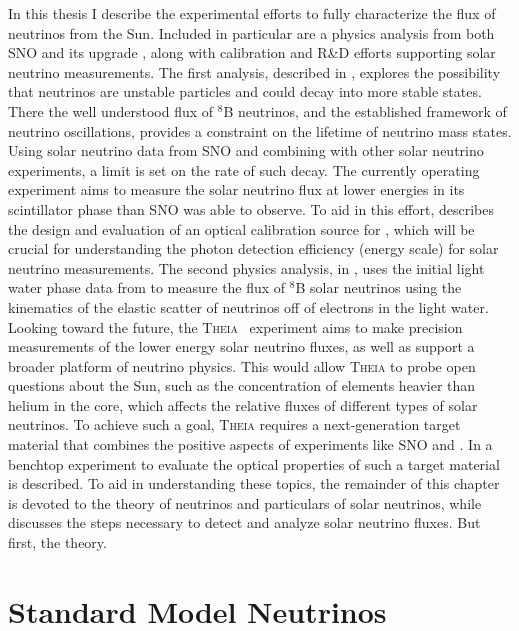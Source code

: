 In this thesis I describe the experimental efforts to fully characterize the flux of neutrinos from the Sun.
Included in particular are a physics analysis from both SNO and its upgrade {\snop}, along with calibration and R\&D efforts supporting solar neutrino measurements.
The first analysis, described in , explores the possibility that neutrinos are unstable particles and could decay into more stable states.
There the well understood flux of $^8$B neutrinos, and the established framework of neutrino oscillations, provides a constraint on the lifetime of neutrino mass states.
Using solar neutrino data from SNO and combining with other solar neutrino experiments, a limit is set on the rate of such decay.
The currently operating {\snop} experiment aims to measure the solar neutrino flux at lower energies in its scintillator phase than SNO was able to observe.
To aid in this effort,  describes the design and evaluation of an optical calibration source for {\snop}, which will be crucial for understanding the photon detection efficiency (energy scale) for solar neutrino measurements.
The second physics analysis, in , uses the initial light water phase data from {\snop} to measure the flux of $^8$B solar neutrinos using the kinematics of the elastic scatter of neutrinos off of electrons in the light water.
Looking toward the future, the \textsc{Theia}~\cite{asdc} experiment aims to make precision measurements of the lower energy solar neutrino fluxes, as well as support a broader platform of neutrino physics.
This would allow \textsc{Theia} to probe open questions about the Sun, such as the concentration of elements heavier than helium in the core, which affects the relative fluxes of different types of solar neutrinos. 
To achieve such a goal, \textsc{Theia} requires a next-generation target material that combines the positive aspects of experiments like SNO and {\snop}. 
In  a benchtop experiment to evaluate the optical properties of such a target material is described.
To aid in understanding these topics, the remainder of this chapter is devoted to the theory of neutrinos and particulars of solar neutrinos, while  discusses the steps necessary to detect and analyze solar neutrino fluxes.
But first, the theory.

\section{Standard Model Neutrinos}
\label{sec:stdmodel}

